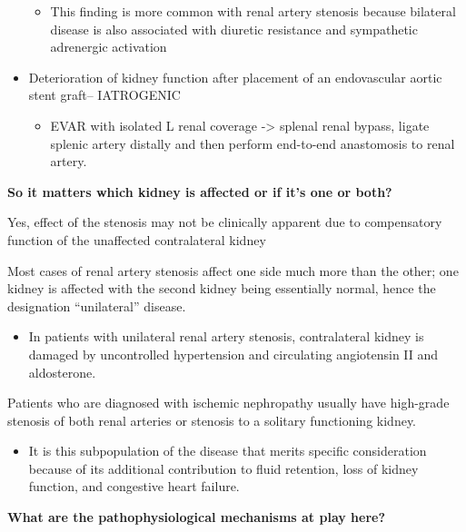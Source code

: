 \documentclass[
]{book}
\providecommand{\tightlist}{%
  \setlength{\itemsep}{0pt}\setlength{\parskip}{0pt}}
\begin{document}
\begin{itemize}
  \begin{itemize}
  \tightlist
  \item
    This finding is more common with renal artery stenosis because
    bilateral disease is also associated with diuretic resistance
    and sympathetic adrenergic activation
  \end{itemize}
\item
  Deterioration of kidney function after placement of an endovascular
  aortic stent graft-- IATROGENIC

  \begin{itemize}
  \tightlist
  \item
    EVAR with isolated L renal coverage -\textgreater{} splenal renal bypass,
    ligate splenic artery distally and then perform end-to-end
    anastomosis to renal artery.
    \citep{benjamin126RenovascularDisease2019}
  \end{itemize}
\end{itemize}

\textbf{So it matters which kidney is affected or if it's one or both?}

Yes, effect of the stenosis may not be clinically apparent due to
compensatory function of the unaffected contralateral kidney

Most cases of renal artery stenosis affect one side much more than the
other; one kidney is affected with the second kidney being essentially
normal, hence the designation ``unilateral'' disease.

\begin{itemize}
\tightlist
\item
  In patients with unilateral renal artery stenosis, contralateral
  kidney is damaged by uncontrolled hypertension and circulating
  angiotensin II and aldosterone. \citep{rickey125RenovascularDisease2019}
\end{itemize}

Patients who are diagnosed with ischemic nephropathy usually have
high-grade stenosis of both renal arteries or stenosis to a solitary
functioning kidney.

\begin{itemize}
\tightlist
\item
  It is this subpopulation of the disease that merits specific
  consideration because of its additional contribution to fluid
  retention, loss of kidney function, and congestive heart failure.
\end{itemize}

\textbf{What are the pathophysiological mechanisms at play here?}
\end{document}
